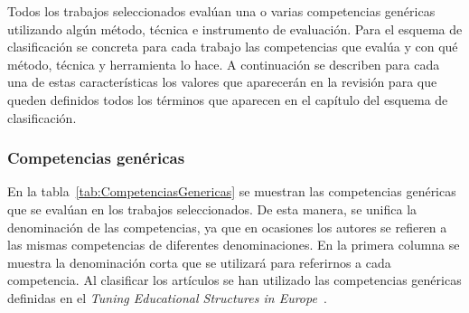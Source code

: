 
Todos los trabajos seleccionados evalúan una o varias competencias genéricas utilizando algún método, técnica e instrumento de evaluación. Para el esquema de clasificación se concreta para cada trabajo las competencias que evalúa y con qué método, técnica y herramienta lo hace. A continuación se describen para cada una de estas características los valores que aparecerán en la revisión para que queden definidos todos los términos que aparecen en el capítulo del esquema de clasificación.

\subsubsection*{Competencias genéricas}

En la tabla~\ref{tab:CompetenciasGenericas} se muestran las competencias genéricas que se evalúan en los trabajos seleccionados. De esta manera, se unifica la denominación de las competencias, ya que en ocasiones los autores se refieren a las mismas competencias de diferentes denominaciones. En la primera columna se muestra la denominación corta que se utilizará para referirnos a cada competencia. Al clasificar los artículos se han utilizado las competencias genéricas definidas en el \emph{Tuning Educational Structures in Europe}~\cite{gonzalez2005tuning}. 


